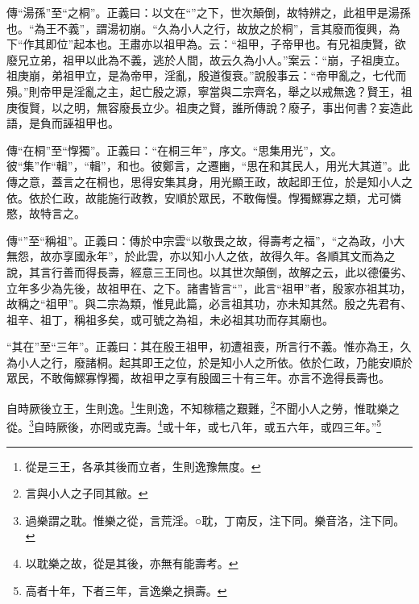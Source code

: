 {\noindent\zhuan{}\fzbyks 傳“湯孫”至“之桐”。正義曰：以文在“”之下，世次顛倒，故特辨之，此祖甲是湯孫也。“為王不義”，謂湯初崩。“久為小人之行，故放之於桐”，言其廢而復興，為下“作其即位”起本也。王肅亦以祖甲為。云：“祖甲，子帝甲也。有兄祖庚賢，欲廢兄立弟，祖甲以此為不義，逃於人間，故云久為小人。”案云：“崩，子祖庚立。祖庚崩，弟祖甲立，是為帝甲，淫亂，殷道復衰。”說殷事云：“帝甲亂之，七代而殞。”則帝甲是淫亂之主，起亡殷之源，寧當與二宗齊名，舉之以戒無逸？賢王，祖庚復賢，以之明，無容廢長立少。祖庚之賢，誰所傳說？廢子，事出何書？妄造此語，是負而誣祖甲也。 \par}

{\noindent\zhuan{}\fzbyks 傳“在桐”至“惸獨”。正義曰：“在桐三年”，序文。“思集用光”，文。彼“集”作“輯”，“輯”，和也。彼鄭言，之遷豳，“思在和其民人，用光大其道”。此傳之意，蓋言之在桐也，思得安集其身，用光顯王政，故起即王位，於是知小人之依。依於仁政，故能施行政教，安順於眾民，不敢侮慢。惸獨鰥寡之類，尤可憐愍，故特言之。 \par}

{\noindent\zhuan{}\fzbyks 傳“”至“稱祖”。正義曰：傳於中宗雲“以敬畏之故，得壽考之福”，“之為政，小大無怨，故亦享國永年”，於此雲，亦以知小人之依，故得久年。各順其文而為之說，其言行善而得長壽，經意三王同也。以其世次顛倒，故解之云，此以德優劣、立年多少為先後，故祖甲在、之下。諸書皆言“”，此言“祖甲”者，殷家亦祖其功，故稱之“祖甲”。與二宗為類，惟見此篇，必言祖其功，亦未知其然。殷之先君有、祖辛、祖丁，稱祖多矣，或可號之為祖，未必祖其功而存其廟也。 \par}

{\noindent\shu{}\fzkt “其在”至“三年”。正義曰：其在殷王祖甲，初遭祖喪，所言行不義。惟亦為王，久為小人之行，廢諸桐。起其即王之位，於是知小人之所依。依於仁政，乃能安順於眾民，不敢侮鰥寡惸獨，故祖甲之享有殷國三十有三年。亦言不逸得長壽也。 \par}

自時厥後立王，生則逸。\footnote{從是三王，各承其後而立者，生則逸豫無度。}生則逸，不知稼穡之艱難，\footnote{言與小人之子同其敝。}不聞小人之勞，惟耽樂之從。\footnote{過樂謂之耽。惟樂之從，言荒淫。○耽，丁南反，注下同。樂音洛，注下同。}自時厥後，亦罔或克壽。\footnote{以耽樂之故，從是其後，亦無有能壽考。}或十年，或七八年，或五六年，或四三年。”\footnote{高者十年，下者三年，言逸樂之損壽。}

